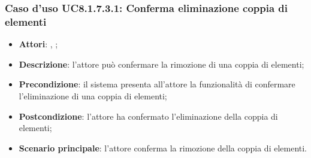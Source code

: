 		\subsubsection{Caso d'uso UC8.1.7.3.1: Conferma eliminazione coppia di elementi}
		\begin{itemize}
			\item \textbf{Attori}: \uau, \uaupro;
			\item \textbf{Descrizione}: l'attore può confermare la rimozione di una coppia di elementi;
			\item \textbf{Precondizione}: il sistema presenta all'attore la funzionalità di confermare l'eliminazione di una coppia di elementi;
			\item \textbf{Postcondizione}: l'attore ha confermato l'eliminazione della coppia di elementi;
			\item \textbf{Scenario principale}: l'attore conferma la rimozione della coppia di elementi.
		\end{itemize}

